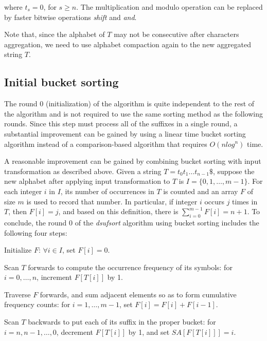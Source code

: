 \documentclass{ws-ijprai}
\begin{document}
\par\noindent
where $t_s = 0$, for $s \geq n$. The multiplication and modulo
operation can be replaced by faster bitwise operations \emph{shift}
and \emph{and}.

Note that, since the alphabet of $T$ may not be consecutive after
characters aggregation, we need to use alphabet compaction again to
the new aggregated string $T$.

\subsection{Initial bucket sorting}

The round 0 (initialization) of the algorithm is quite independent
to the rest of the algorithm and is not required to use the same
sorting method as the following rounds. Since this step must process
all of the suffixes in a single round, a substantial improvement
can be gained by using a linear time bucket sorting algorithm
instead of a comparison-based algorithm that requires $O(nlog^n)$
time.

A reasonable improvement can be gained by combining bucket sorting
with input transformation as described above. Given a string $T =
t_0t_1 \dots t_{n-1}\$$, suppose the new alphabet after applying input
transformation to $T$ is $I = \{0,1,\dots,m-1\}$. For each integer $i$ in
$I$, its number of occurrences in $T$ is counted and an array $F$ of size $m$ is
used to record that number. In particular, if integer $i$ occurs
$j$ times in $T$, then $F[i] = j$, and based on this definition, there
is $\sum_{i=0}^{m-1} F[i] = n + 1$. To conclude, the round 0 of the
\emph{dsufsort} algorithm using bucket sorting includes the following four steps:

\begin{arabiclist}
\item Initialize $F$: $\forall i \in I$, set $F[i] = 0$.
\item Scan $T$ forwards to compute the occurrence frequency of
its symbols: for $i = 0,\dots,n$, increment $F[T[i]]$ by 1.
\item Traverse $F$ forwards, and sum adjacent elements so as
to form cumulative frequency counts: for $i = 1, \dots, m-1$, set
$F[i] = F[i] + F[i-1]$.
\item Scan $T$ backwards to put each of its suffix in the proper
bucket: for $i = n, n-1,\dots, 0$, decrement $F[T[i]]$ by 1, and set
$SA[F[T[i]]] = i$.
\end{arabiclist}
\end{document}

